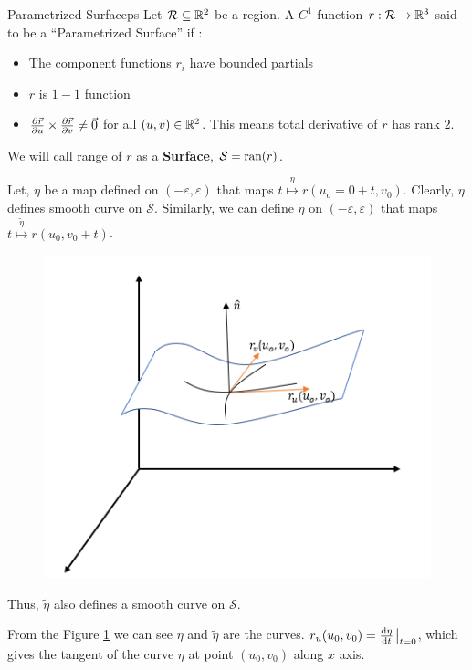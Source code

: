 \documentclass[../Analysis-3.tex]{subfiles}
\begin{document}
\begin{Def}{Parametrized Surface}{ps}
  Let $\mathcal{R} \subseteq \mathbb{R}^2$ be a region. A $C^1$ function $r:\mathcal{R} \to \mathbb{R}^3$ said to be a \enquote{Parametrized Surface} if :
  \begin{itemize}
    \item The component functions $r_i$ have bounded partials
    \item $r$ is $1-1$ function
    \item $\pdv{\vec{r}}{u} \times \pdv{\vec{r}}{v} \neq \vec{0}$ for all $(u,v) \in \mathbb{R}^2$. This means total derivative of $r$ has rank $2$.
  \end{itemize}
  We will call range of $r$ as a \textbf{Surface}, $ \mathcal{S} = \operatorname{ran}(r)$.
\end{Def}

Let, $\eta$ be a map defined on $(-\varepsilon,\varepsilon)$ that maps $t \overset{\eta}{\mapsto} r(u_o=0 + t,v_0)$. Clearly, $\eta$ defines smooth curve on $\mathcal{S}$. Similarly, we can define $\tilde{\eta}$ on $(-\varepsilon,\varepsilon)$ that maps $t \overset{\tilde{\eta}}{\mapsto} r(u_0,v_0+t)$.

\begin{figure}
  \centering
  \includegraphics[width=.78\linewidth]{../figures/lec-24.2.png}
  \caption{\label{fig24:1}}
\end{figure}

Thus, $\tilde{\eta}$ also defines a smooth curve on $\mathcal{S}$.

From the Figure \ref{fig24:1} we can see $\eta$ and $\tilde{\eta}$ are the curves. $r_u(u_0,v_0)=\dv{\eta}{t}\eval_{t=0}$, which gives the tangent of the curve $\eta$ at point $(u_0,v_0)$ along $x$ axis.
\end{document}
